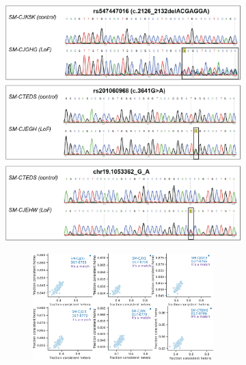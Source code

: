\begin{figure}[ht]
    \begin{subfigure}[t]{.5\textwidth}
        \caption{}
        \includegraphics[width=\textwidth]{./extended_plots/sanger_seq.png}        
    \end{subfigure}  
    \begin{subfigure}[t]{.5\textwidth}
        \begin{subfigure}[t]{\textwidth}
            \caption{}
            \includegraphics[width=\textwidth]{./extended_plots/sample_swap.png}        
        \end{subfigure}  

\end{subfigure}
\end{figure}
